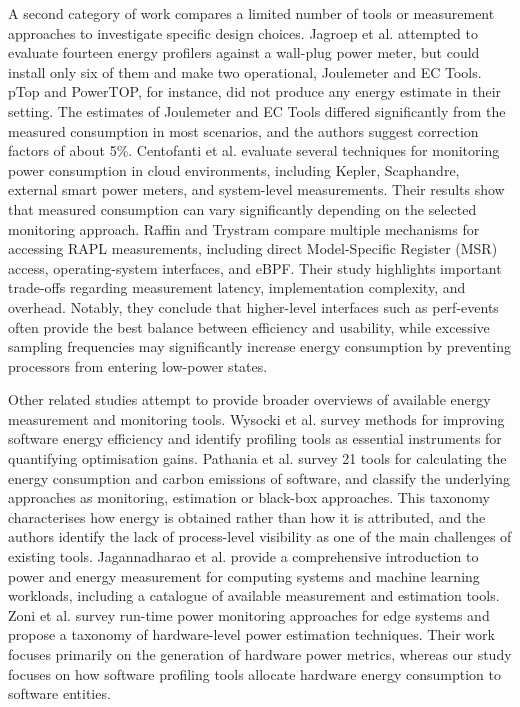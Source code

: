 \documentclass[
  acmsmall,
  screen,
  review,
  xcolor={dvipsnames,usenames}
]{acmart}
\begin{document}
A second category of work compares a limited number of tools or measurement approaches to investigate specific design choices. Jagroep et al. \cite{jagroepProfilingEnergyProfilers2015} attempted to evaluate fourteen energy profilers against a wall-plug power meter, but could install only six of them and make two operational, Joulemeter and EC Tools. pTop and PowerTOP, for instance, did not produce any energy estimate in their setting. The estimates of Joulemeter and EC Tools differed significantly from the measured consumption in most scenarios, and the authors suggest correction factors of about 5\%. Centofanti et al. \cite{centofantiImpactPowerConsumption2024} evaluate several techniques for monitoring power consumption in cloud environments, including Kepler, Scaphandre, external smart power meters, and system-level measurements. Their results show that measured consumption can vary significantly depending on the selected monitoring approach. Raffin and Trystram \cite{raffinDissectingSoftwarebasedMeasurement2025} compare multiple mechanisms for accessing RAPL measurements, including direct Model-Specific Register (MSR) access, operating-system interfaces, and eBPF. Their study highlights important trade-offs regarding measurement latency, implementation complexity, and overhead. Notably, they conclude that higher-level interfaces such as perf-events often provide the best balance between efficiency and usability, while excessive sampling frequencies may significantly increase energy consumption by preventing processors from entering low-power states.

Other related studies attempt to provide broader overviews of available energy measurement and monitoring tools. Wysocki et al. \cite{wysockiMethodsImprovingSoftware2025} survey methods for improving software energy efficiency and identify profiling tools as essential instruments for quantifying optimisation gains. Pathania et al. \cite{pathaniaCalculatingSoftwaresEnergy2025} survey 21 tools for calculating the energy consumption and carbon emissions of software, and classify the underlying approaches as monitoring, estimation or black-box approaches. This taxonomy characterises how energy is obtained rather than how it is attributed, and the authors identify the lack of process-level visibility as one of the main challenges of existing tools. Jagannadharao et al. \cite{jagannadharaoBeginnersGuidePower2024} provide a comprehensive introduction to power and energy measurement for computing systems and machine learning workloads, including a catalogue of available measurement and estimation tools. Zoni et al. \cite{zoniSurveyRuntimePower2023} survey run-time power monitoring approaches for edge systems and propose a taxonomy of hardware-level power estimation techniques. Their work focuses primarily on the generation of hardware power metrics, whereas our study focuses on how software profiling tools allocate hardware energy consumption to software entities.
\end{document}
